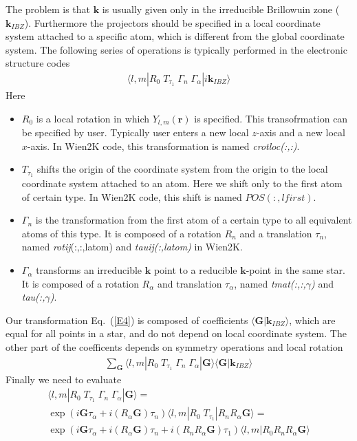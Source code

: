 \documentclass[aps,prb,floatfix,epsfig,twocolumn,showpacs,preprintnumbers]{revtex4}
\renewcommand{\vr}{{\mathbf{r}}}
\newcommand{\vG}{{\mathbf{G}}}
\newcommand{\vk}{{\mathbf{k}}}
\begin{document}
The problem is that $\vk$ is usually given only in the irreducible
Brillowuin zone ($\vk_{IBZ}$). Furthermore the projectors should be
specified in a local coordinate system attached to a specific atom,
which is different from the global coordinate system. The following
series of operations is typically performed in the electronic
structure codes
\begin{eqnarray}
\langle l,m| R_0\; T_{\tau_1}\;\Gamma_n\;
\Gamma_\alpha|i\vk_{IBZ}\rangle
\label{E4}
\end{eqnarray}
Here
\begin{itemize}
\item $R_0$ is a local rotation in which $Y_{l,m}(\vr)$ is specified. This
  transofrmation can be specified by user. Typically user
  enters a new local $z$-axis and a new local $x$-axis.
  In Wien2K code, this transformation is named \textit{crotloc(:,:)}.
\item $T_{\tau_1}$ shifts the origin of the coordinate system from the
  origin to the local coordinate system attached to an atom. Here we
  shift only to the first atom of certain type.
  In Wien2K code, this shift is named $POS(:,lfirst)$.
\item $\Gamma_n$ is the transformation from the first atom of a certain
  type to all equivalent atoms of this type. It is composed of a
  rotation $R_n$ and a translation $\tau_n$, named 
  \textit{rotij}(:,:,latom) and 
  \textit{tauij(:,latom)} in Wien2K.
\item $\Gamma_\alpha$ transforms an irreducible $\vk$ point to a
  reducible $\vk$-point in the same star.
  It is composed of a rotation $R_{\alpha}$ and translation
  $\tau_{\alpha}$, named \textit{tmat(:,:,$\gamma$)} and
  \textit{tau(:,$\gamma$)}.
\end{itemize}

Our transformation Eq.~(\ref{E4}) is composed of coefficients
$\langle \vG |\vk_{IBZ}\rangle$, which are equal for all points in a
star, and do not depend on local coordinate system. The other part of
the coefficents depends on symmetry operations and local rotation
\begin{eqnarray}
\sum_\vG \langle l,m|R_0\; T_{\tau_1}\; \Gamma_n\;\Gamma_\alpha|\vG\rangle\langle \vG |\vk_{IBZ}\rangle
\end{eqnarray}
Finally we need to evaluate
\begin{eqnarray}
\langle l,m|R_0\; T_{\tau_1}\; \Gamma_n\;\Gamma_\alpha|\vG\rangle=\\
\exp\left({i\vG\tau_\alpha + i (R_\alpha \vG) \tau_n}\right)\langle
l,m|R_0\; T_{\tau_1}|R_n R_\alpha \vG\rangle=\\
\exp\left({ i\vG\tau_\alpha + i (R_\alpha \vG) \tau_n + i(R_n R_\alpha \vG)\tau_1}\right)\langle
l,m|R_0 R_n R_\alpha \vG\rangle
\end{eqnarray}
\end{document}
